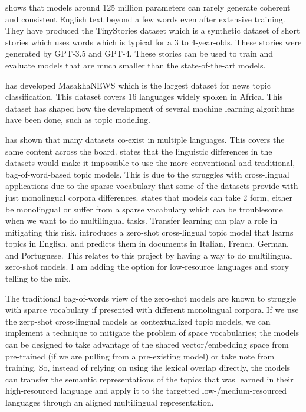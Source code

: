 \documentclass[11pt]{article} %
\begin{document}
    \citet{eldan2023tinystories} shows that models around 125 million parameters
    can rarely generate coherent and consistent English text beyond a few words
    even after extensive training. They have produced the TinyStories dataset which
    is a synthetic dataset of short stories which uses words which is typical for
    a 3 to 4-year-olds. These stories were generated by GPT-3.5 and GPT-4. These
    stories can be used to train and evaluate models that are much smaller than
    the state-of-the-art models.

    \citet{adelani-etal-2022-masakhanews} has developed MasakhaNEWS which is the largest
    dataset for news topic classification. This dataset covers 16 languages
    widely spoken in Africa. This dataset has shaped how the development of several
    machine learning algorithms have been done, such as topic modeling.

    \citet{bianchi-etal-2021-cross} has shown that many datasets co-exist in multiple
    languages. This covers the same content across the board. \citet{bianchi-etal-2021-cross}
    states that the linguistic differences in the datasets would make it
    impossible to use the more conventional and traditional, bag-of-word-based topic
    models. This is due to the struggles with cross-lingual applications due to
    the sparse vocabulary that some of the datasets provide with just
    monolingual corpora differences. \citet{bianchi-etal-2021-cross} states that
    models can take 2 form, either be monolingual or suffer from a sparse vocabulary
    which can be troublesome when we want to do multilingual tasks. Transfer
    learning can play a role in mitigating this risk. \citet{bianchi-etal-2021-cross}
    introduces a zero-shot cross-lingual topic model that learns topics in
    English, and predicts them in documents in Italian, French, German, and
    Portuguese. This relates to this project by having a way to do multilingual zero-shot
    models. I am adding the option for low-resource languages and story telling
    to the mix.

    The traditional bag-of-words view of the zero-shot models are known to
    struggle with sparce vocabulary if presented with different monolingual
    corpora. If we use the zerp-shot cross-lingual models as contextualized topic
    models, we can implement a technique to mitigate the problem of space
    vocabularies; the models can be designed to take advantage of the shared vector/embedding
    space from pre-trained (if we are pulling from a pre-existing model) or take note
    from training. So, instead of relying on using the lexical overlap directly,
    the models can transfer the semantic representations of the topics that was
    learned in their high-resourced language and apply it to the targetted low-/medium-resourced
    languages through an aligned multilingual representation.
\end{document}
